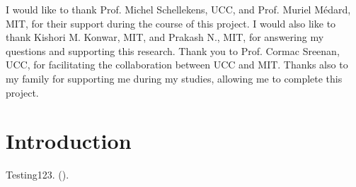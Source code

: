 \documentclass[12pt]{report}
\newcommand{\citebu}[1]{\citeauthor{#1} (\citeyear{#1})}
\theoremstyle{definition}
\begin{document}
    \vspace{1cm}

    I would like to thank Prof. Michel Schellekens, UCC, and Prof. Muriel M\'{e}dard, MIT, for their support during the course of this project. I would also like to thank Kishori M. Konwar, MIT, and Prakash N., MIT, for answering my questions and supporting this research. Thank you to Prof. Cormac Sreenan, UCC, for facilitating the collaboration between UCC and MIT. Thanks also to my family for supporting me during my studies, allowing me to complete this project.

  \tableofcontents

  \chapter{Introduction}
    Testing123. \citebu{attiya1995sharing}.

  
  
  
\end{document}
